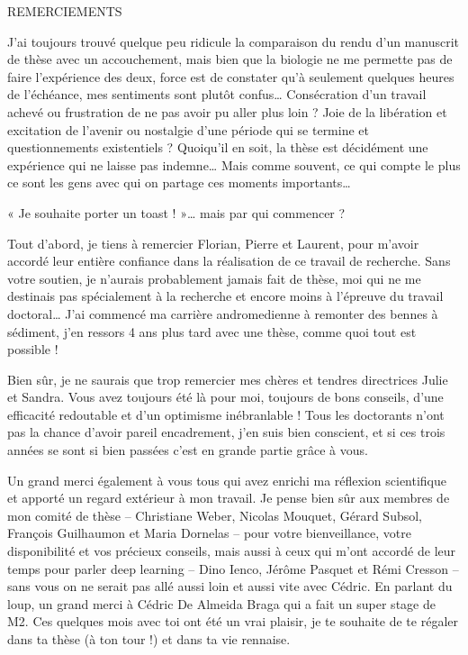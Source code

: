 
{}
{\centerline { {\sffamily \Large REMERCIEMENTS}}}

\vspace*{1cm}
\vskip 0.5cm
\noindent

J’ai toujours trouvé quelque peu ridicule la comparaison du rendu d’un manuscrit de thèse avec un accouchement, mais bien que la biologie ne me permette pas de faire l’expérience des deux, force est de constater qu’à seulement quelques heures de l'échéance, mes sentiments sont plutôt confus… Consécration d’un travail achevé ou frustration de ne pas avoir pu aller plus loin ? Joie de la libération et excitation de l’avenir ou nostalgie d’une période qui se termine et questionnements existentiels ? Quoiqu’il en soit, la thèse est décidément une expérience qui ne laisse pas indemne… Mais comme souvent, ce qui compte le plus ce sont les gens avec qui on partage ces moments importants…

« Je souhaite porter un toast ! »… mais par qui commencer ?

Tout d’abord, je tiens à remercier Florian, Pierre et Laurent, pour m’avoir accordé leur entière confiance dans la réalisation de ce travail de recherche. Sans votre soutien, je n’aurais probablement jamais fait de thèse, moi qui ne me destinais pas spécialement à la recherche et encore moins à l’épreuve du travail doctoral… J’ai commencé ma carrière andromedienne à remonter des bennes à sédiment, j’en ressors 4 ans plus tard avec une thèse, comme quoi tout est possible !

Bien sûr, je ne saurais que trop remercier mes chères et tendres directrices Julie et Sandra. Vous avez toujours été là pour moi, toujours de bons conseils, d’une efficacité redoutable et d’un optimisme inébranlable ! Tous les doctorants n’ont pas la chance d’avoir pareil encadrement, j’en suis bien conscient, et si ces trois années se sont si bien passées c’est en grande partie grâce à vous. 

Un grand merci également à vous tous qui avez enrichi ma réflexion scientifique et apporté un regard extérieur à mon travail. Je pense bien sûr aux membres de mon comité de thèse – Christiane Weber, Nicolas Mouquet, Gérard Subsol, François Guilhaumon et Maria Dornelas – pour votre bienveillance, votre disponibilité et vos précieux conseils, mais aussi à ceux qui m’ont accordé de leur temps pour parler deep learning – Dino Ienco, Jérôme Pasquet et Rémi Cresson – sans vous on ne serait pas allé aussi loin et aussi vite avec Cédric. En parlant du loup, un grand merci à Cédric De Almeida Braga qui a fait un super stage de M2. Ces quelques mois avec toi ont été un vrai plaisir, je te souhaite de te régaler dans ta thèse (à ton tour !) et dans ta vie rennaise.

